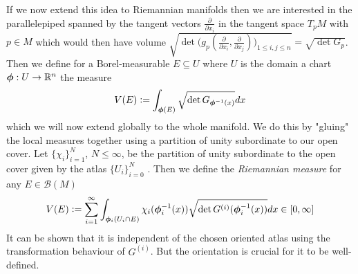 \documentclass[../master_thesis.tex]{subfiles}
\begin{document}
If we now extend this idea to Riemannian manifolds then we are interested 
in the parallelepiped spanned by the tangent vectors $\frac{\partial}{\partial x_i}$
in the tangent space $T_p M$ with $p \in M$
which would then have volume $ \sqrt{\det \big( g_p(\frac{\partial}{\partial x_i}, 
\frac{\partial}{\partial x_j}) \big)_{1\leq i,j \leq n} } = 
\sqrt{ \det G_p }$. Then we define for a Borel-measurable $E \subseteq U$ where $U$ is 
the domain a chart $\boldsymbol{\phi}: U \rightarrow \mathbb{R}^n$ the measure 
\begin{align*}
    V(E) \vcentcolon= \int_{\boldsymbol{\phi}(E)} \sqrt{ \det G_{\boldsymbol{\phi}^{-1}(x)}} dx 
\end{align*} 
which we will now extend globally to the whole manifold. We do this 
by "gluing" the local measures together using a partition of unity subordinate 
to our open cover. 
Let $\{ \chi_i \}_{i=1}^N$, $N \leq \infty$, be the partition of unity 
subordinate to the open cover given by the atlas $\{U_i\}_{i = 0}^N$ . Then we define the 
\textit{Riemannian measure} for any $E \in \mathcal{B}(M)$
\begin{align}
    V(E) \vcentcolon= \sum\limits_{i=1}^\infty \int_{\boldsymbol{\phi}_i(U_i \cap E)}
        \chi_i(\boldsymbol{\phi}_i^{-1}(x)) \sqrt{\det G^{(i)}(\boldsymbol{\phi}_i^{-1}(x))} dx 
        \in [0,\infty] \label{eq:riemannian_measure}
\end{align}
It can be shown that it is independent of the chosen oriented atlas 
using the transformation behaviour of $G^{(i)}$. But the orientation is 
crucial for it to be well-defined. 
\end{document}
